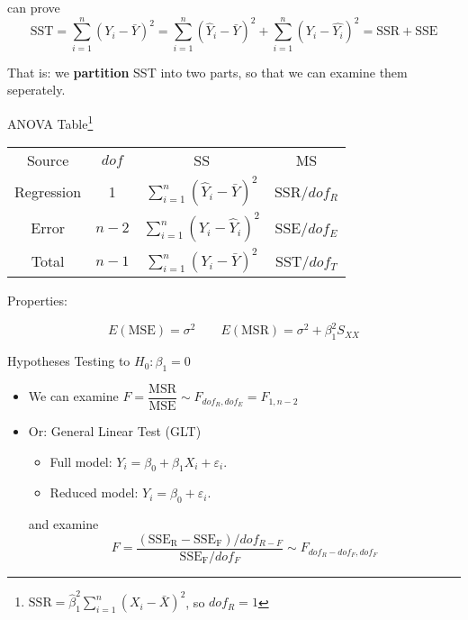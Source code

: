     can prove
    \[
        \mathrm{SST}=\sum_{i=1}^n(Y_i-\bar{Y})^2=\sum_{i=1}^n(\hat{Y}_i-\bar{Y})^2+\sum_{i=1}^n(Y_i-\hat{Y_i})^2=\mathrm{SSR+SSE} 
    \]

    That is: we \textbf{partition} SST into two parts, so that we can examine them seperately.

    \begin{point}
        ANOVA Table\footnote{$ \mathrm{SSR}=\hat{\beta }_1^2\sum_{i=1}^n(X_i-\bar{X})^2$, so $ dof_R=1 $}
    \end{point}
    \begin{table}[H]
        \centering
        \renewcommand\arraystretch{1}
        \begin{tabular}{c|ccc}
            \hline
            Source&$ dof $&SS&MS\\
            Regression&1&$ \sum_{i=1}^n(\hat{Y}_i-\bar{Y})^2  $&SSR/$ dof_R $\\
            Error&$ n-2 $&$ \sum_{i=1}^n(Y_i-\hat{Y}_i)^2  $&SSE/$ dof_E $\\
            Total&$ n-1 $&$ \sum_{i=1}^n(Y_i-\bar{Y})^2  $&SST/$ dof_T $\\
            \hline
        \end{tabular}
    \end{table}
    
    Properties:
    
    \[
        E(\mathrm{MSE})=\sigma ^2\qquad E(\mathrm{MSR})=\sigma ^2+\beta _1^2S_{XX} 
    \]
    
\begin{point}
    Hypotheses Testing to $ H_0:\beta _1=0 $
\end{point}
\begin{itemize}[topsep=2pt,itemsep=2pt]
    \item 
    We can examine $ F=\dfrac{\mathrm{MSR}}{\mathrm{MSE}}\sim F_{dof_R,dof_E}=F_{1,n-2} $
    \item    Or: General Linear Test (GLT)\begin{itemize}[topsep=2pt,itemsep=2pt]
        \item Full model: $ Y_i=\beta _0+\beta _1X_i+\varepsilon _i $.
        \item Reduced model: $ Y_i=\beta _0+\varepsilon _i $.
    \end{itemize}

    and examine
    \[
        F=\dfrac{(\mathrm{SSE_R-SSE_F})/dof_{R-F} }{\mathrm{SSE_F}/dof_F} \sim F_{dof_{R}-dof_F,dof_F}
    \]
\end{itemize}

